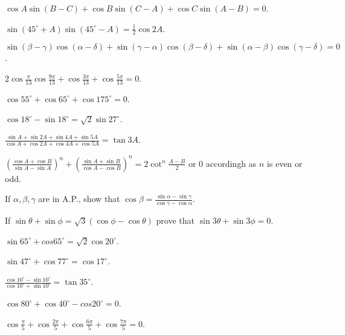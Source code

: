 \item $\cos A\sin(B - C) + \cos B\sin(C - A) + \cos C\sin(A - B) = 0$.

\item $\sin(45^\circ + A)\sin(45^\circ - A) = \frac{1}{2}\cos 2A$.

\item $\sin(\beta - \gamma)\cos(\alpha - \delta) + \sin(\gamma - \alpha)\cos(\beta - \delta) + \sin(\alpha -
    \beta)\cos(\gamma - \delta) = 0$.

\item $2\cos\frac{\pi}{13}\cos \frac{9\pi}{13} + \cos \frac{3\pi}{13} + \cos \frac{5\pi}{13} = 0$.

\item $\cos 55^\circ + \cos65^\circ + \cos 175^\circ = 0$.

\item $\cos 18^\circ -\sin 18^\circ = \sqrt{2}\sin 27^\circ$.

\item $\frac{\sin A + \sin 2A + \sin 4A + \sin 5A}{\cos A + \cos 2A + \cos 4A + \cos 5A} = \tan 3A$.

\item $\left(\frac{\cos A + \cos B}{\sin A - \sin A}\right)^n + \left(\frac{\sin A + \sin B}{\cos A - \cos B}\right)^n =
    2\cot^n \frac{A - B}{2}$ or $0$ accordingh as $n$ is even or odd.

\item If $\alpha, \beta, \gamma$ are in A.P., show that $\cos\beta = \frac{\sin\alpha - \sin\gamma}{\cos\gamma - \cos\alpha}$.

\item If $\sin\theta + \sin\phi = \sqrt{3}(\cos\phi - \cos\theta)$ prove that $\sin3\theta + \sin3\phi = 0$.

\item $\sin 65^\circ + cos 65^\circ = \sqrt{2}\cos 20^\circ$.

\item $\sin 47^\circ + \cos 77^\circ = \cos 17^\circ$.

\item $\frac{\cos 10^\circ - \sin 10^\circ}{\cos 10^\circ + \sin 10^\circ} = \tan 35^\circ$.

\item $\cos 80^\circ + \cos 40^\circ - cos 20^\circ = 0$.

\item $\cos\frac{\pi}{5} + \cos \frac{2\pi}{5} + \cos\frac{6\pi}{5} + \cos \frac{7\pi}{5} = 0$.

